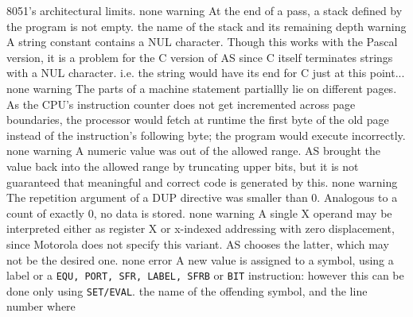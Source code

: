 \documentclass[12pt,twoside]{report}
\newcommand{\tty}[1]{{\tt #1}}
\begin{document}
\begin{description}
{                8051's architectural limits.}
               {none}
               {warning}
               {At the end of a pass, a stack defined by the program is
                not empty.}
               {the name of the stack and its remaining depth}
               {warning}
               {A string constant contains a NUL character. Though this
                works with the Pascal version, it is a problem for the 
                C version of AS since C itself terminates strings with
                a NUL character. i.e. the string would have its end for
                C just at this point...}
               {none}
               {warning}
               {The parts of a machine statement partiallly lie on
                different pages.  As the CPU's instruction counter does
                not get incremented across page boundaries, the processor
                would fetch at runtime the first byte of the old page
                instead of the instruction's following byte; the program
                would execute incorrectly.}
               {none}
               {warning}
               {A numeric value was out of the allowed range.  AS brought
                the value back into the allowed range by truncating upper
                bits, but it is not guaranteed that meaningful and correct
                code is generated by this.}
               {none}
               {warning}
               {The repetition argument of a DUP directive was smaller
                than 0.  Analogous to a count of exactly 0, no data is
                stored.}
               {none}
               {warning}
               {A single X operand may be interpreted either as register X
                or x-indexed addressing with zero displacement, since 
                Motorola does not specify this variant.  AS chooses the
                latter, which may not be the desired one.}
               {none}
               {error}
               {A new value is assigned to a symbol, using a label or a
                \tty{EQU, PORT, SFR, LABEL, SFRB} or \tty{BIT} instruction: however this
                can be done only using \tty{SET/EVAL}.}
               {the name of the offending symbol, and the line number where
}
\end{description}
\end{document}
